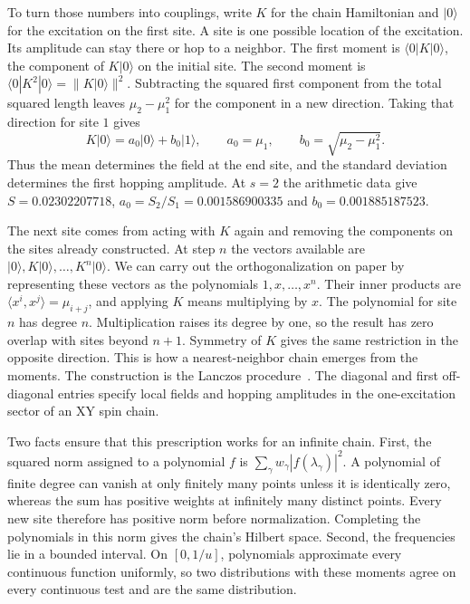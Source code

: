 \documentclass[11pt,letterpaper]{article}
\numberwithin{equation}{section}
\begin{document}
To turn those numbers into couplings, write $K$ for the chain Hamiltonian and $|0\rangle$ for the excitation on the first site. A site is one possible location of the excitation. Its amplitude can stay there or hop to a neighbor. The first moment is $\langle0|K|0\rangle$, the component of $K|0\rangle$ on the initial site. The second moment is $\langle0|K^2|0\rangle=\|K|0\rangle\|^2$. Subtracting the squared first component from the total squared length leaves $\mu_2-\mu_1^2$ for the component in a new direction. Taking that direction for site $1$ gives
\begin{equation}
 K|0\rangle=a_0|0\rangle+b_0|1\rangle,\qquad
 a_0=\mu_1,\qquad b_0=\sqrt{\mu_2-\mu_1^2}.
 \label{eq:hop}
\end{equation}
Thus the mean determines the field at the end site, and the standard deviation determines the first hopping amplitude. At $s=2$ the arithmetic data give $S=0.02302207718$, $a_0=S_2/S_1=0.001586900335$ and $b_0=0.001885187523$.

The next site comes from acting with $K$ again and removing the components on the sites already constructed. At step $n$ the vectors available are $|0\rangle,K|0\rangle,\ldots,K^n|0\rangle$. We can carry out the orthogonalization on paper by representing these vectors as the polynomials $1,x,\ldots,x^n$. Their inner products are $\langle x^i,x^j\rangle=\mu_{i+j}$, and applying $K$ means multiplying by $x$. The polynomial for site $n$ has degree $n$. Multiplication raises its degree by one, so the result has zero overlap with sites beyond $n+1$. Symmetry of $K$ gives the same restriction in the opposite direction. This is how a nearest-neighbor chain emerges from the moments. The construction is the Lanczos procedure~\cite{jacobi}. The diagonal and first off-diagonal entries specify local fields and hopping amplitudes in the one-excitation sector of an XY spin chain.

Two facts ensure that this prescription works for an infinite chain. First, the squared norm assigned to a polynomial $f$ is $\sum_\gamma w_\gamma|f(\lambda_\gamma)|^2$. A polynomial of finite degree can vanish at only finitely many points unless it is identically zero, whereas the sum has positive weights at infinitely many distinct points. Every new site therefore has positive norm before normalization. Completing the polynomials in this norm gives the chain's Hilbert space. Second, the frequencies lie in a bounded interval. On $[0,1/u]$, polynomials approximate every continuous function uniformly, so two distributions with these moments agree on every continuous test and are the same distribution.
\end{document}
